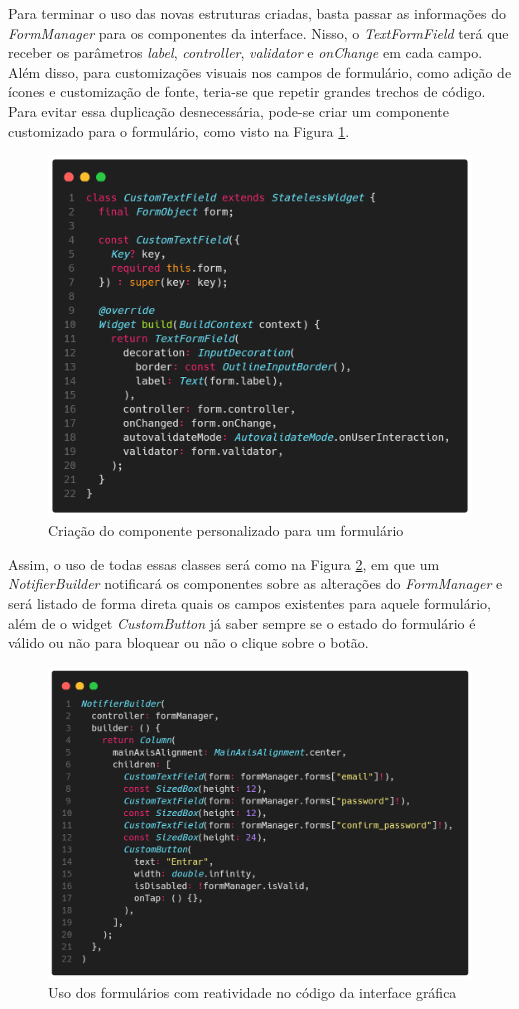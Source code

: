 \documentclass[12pt, %
openright, 
oneside, %
a4paper,    %
brazil]{facom-ufu-abntex2}
\begin{document}
Para terminar o uso das novas estruturas criadas, basta passar as informações do \textit{FormManager} para os componentes da interface. Nisso, o \textit{TextFormField} terá que receber os parâmetros \textit{label}, \textit{controller}, \textit{validator} e \textit{onChange} em cada campo. Além disso, para customizações visuais nos campos de formulário, como adição de ícones e customização de fonte, teria-se que repetir grandes trechos de código. Para evitar essa duplicação desnecessária, pode-se criar um componente customizado para o formulário, como visto na Figura \ref{fig:custom_text_field}.

\begin{figure}[ht]
    \centering
    \includegraphics[width=.65\textwidth, trim={0 30 0 100}, clip]{figures/forms/custom_text_field.png}
    \caption{Criação do componente personalizado para um formulário}
    \label{fig:custom_text_field}
\end{figure}

Assim, o uso de todas essas classes será como na Figura \ref{fig:use_of_form_proposal}, em que um \textit{NotifierBuilder} notificará os componentes sobre as alterações do \textit{FormManager} e será listado de forma direta quais os campos existentes para aquele formulário, além de o widget \textit{CustomButton} já saber sempre se o estado do formulário é válido ou não para bloquear ou não o clique sobre o botão.

\begin{figure}[ht]
    \centering
    \includegraphics[width=.65\textwidth, trim={0 30 0 100}, clip]{figures/forms/use_of_form_proposal.png}
    \caption{Uso dos formulários com reatividade no código da interface gráfica}
    \label{fig:use_of_form_proposal}
\end{figure}
\end{document}
